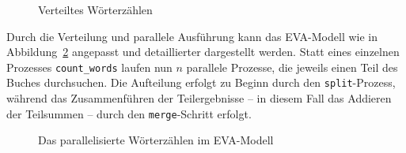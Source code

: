 \documentclass[
  ngerman,
  letterpaper,
  DIV=11]{scrreprt}
\begin{document}
\begin{figure}


\caption{\label{fig-problem-solving-word-count-distributed}Verteiltes
Wörterzählen}

\end{figure}%

Durch die Verteilung und parallele Ausführung kann das EVA-Modell wie in
Abbildung~\ref{fig-eva-distributed} angepasst und detaillierter
dargestellt werden. Statt eines einzelnen Prozesses
\texttt{count\_words} laufen nun \(n\) parallele Prozesse, die jeweils
einen Teil des Buches durchsuchen. Die Aufteilung erfolgt zu Beginn
durch den \texttt{split}-Prozess, während das Zusammenführen der
Teilergebnisse -- in diesem Fall das Addieren der Teilsummen -- durch
den \texttt{merge}-Schritt erfolgt.

\begin{figure}


\caption{\label{fig-eva-distributed}Das parallelisierte Wörterzählen im
EVA-Modell}

\end{figure}%
\end{document}

